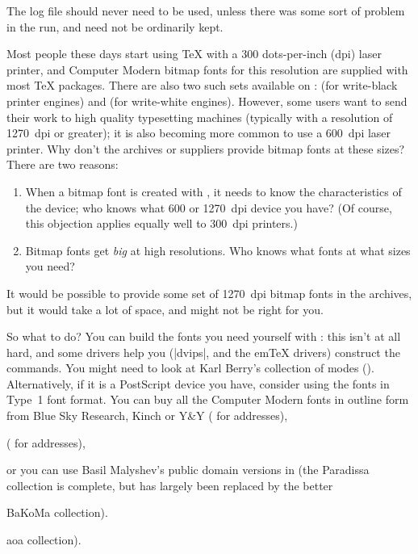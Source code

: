 The log file should never need to be used, unless there was some sort
of problem in the \MF{} run, and need not be ordinarily kept.


Most people these days start using \TeX{} with a 300 dots-per-inch (dpi)
laser printer, and Computer Modern bitmap fonts for this resolution
are supplied with most \TeX{} packages.   There are also two such sets
available on :  (for write-black printer engines)
and  (for write-white engines).
However, some users want to
send their work to high quality typesetting machines (typically with a
resolution of 1270~dpi or greater); it is also becoming more common to
use a 600~dpi laser printer. Why don't the archives or suppliers
provide bitmap fonts at these sizes? There are two reasons:
\begin{enumerate}
\item When a bitmap font is created with \MF{}, it needs to know the
  characteristics of the device; who knows what 600 or 1270~dpi device
  you have?  (Of course, this objection applies equally well to
  300~dpi printers.)
\item Bitmap fonts get \emph{big} at high resolutions. Who knows what
  fonts at what sizes you need?
\end{enumerate}
It would be possible to provide some set of 1270~dpi bitmap fonts in
the archives, but it would take a lot of space, and might not be right
for you. 

So what to do?  You can build the fonts you need yourself with \MF{}:
this isn't at all hard, and some drivers help you (\ProgName|dvips|, and the
em\TeX{} drivers) construct the \MF{} commands. You might need to look
at Karl Berry's collection of \MF{} modes (). 
Alternatively, if it is a PostScript device you have, consider using
the fonts in Type~1 font format. You can buy all the Computer Modern
fonts in
outline form from Blue Sky Research, Kinch or Y\&Y 
\htmlignore
( for addresses),
\endhtmlignore
\begin{htmlversion}
  ( for addresses),
\end{htmlversion}
or you can use Basil
Malyshev's public domain versions in  (the Paradissa
collection is complete, but has largely been replaced by the better
\begin{htmlversion}
  BaKoMa collection).%
\end{htmlversion}
\htmlignore
{}aoa collection).%
\endhtmlignore

